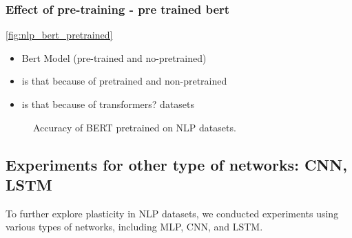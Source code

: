 \subsubsection{Effect of pre-training - pre trained bert}
\autoref{fig:nlp_bert_pretrained}
\begin{itemize}
    \item Bert Model (pre-trained and no-pretrained)
    \item is that because of pretrained and non-pretrained
    \item is that because of transformers?
          datasets %
\end{itemize}


\begin{figure}[htb!]
    \centering
    \caption{Accuracy of BERT pretrained on NLP datasets.}
    \label{fig:nlp_bert_pretrained}
\end{figure}



\subsection{Experiments for other type of networks: CNN, LSTM}

To further explore plasticity in NLP datasets, we conducted experiments using various types of networks, including MLP, CNN, and LSTM.

